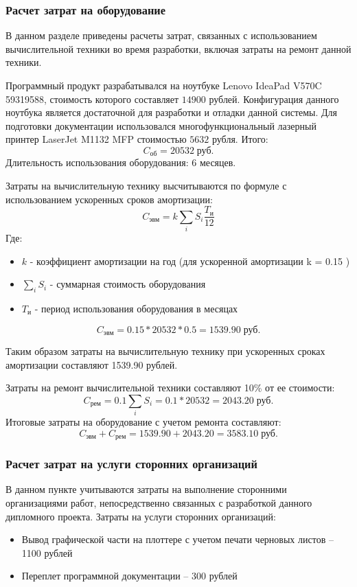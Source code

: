 \documentclass[russian,utf8,emptystyle]{eskdtext}
\begin{document}
\begin{spacing}{1.5}
\subsubsection{Расчет затрат на оборудование}
В данном разделе приведены расчеты затрат, связанных с использованием вычислительной техники во время разработки, включая затраты на ремонт данной техники.

Программный продукт разрабатывался на ноутбуке Lenovo IdeaPad V570C 59319588, стоимость которого составляет $14900$ рублей. Конфигурация данного ноутбука является достаточной для разработки и отладки данной системы. Для подготовки документации использовался многофункциональный лазерный принтер LaserJet M1132 MFP стоимостью $5632$ рубля. Итого:
$$
C_\text{об} = 20532 \; \text{руб.}
$$
Длительность использования оборудования: 6 месяцев.

Затраты на вычислительную технику высчитываются по формуле с использованием ускоренных сроков амортизации:
$$
C_\text{эвм} = k \sum_i S_i \frac{T_\text{и}}{12}
$$
Где:
\begin{itemize}
\item $k$ - коэффициент амортизации на год (для ускоренной амортизации k = 0.15 )
\item $\sum_i S_i$ - суммарная стоимость оборудования
\item $T_\text{и}$ - период использования оборудования в месяцах
\end{itemize}

$$
C_\text{эвм} = 0.15 * 20532 * 0.5 = 1539.90 \; \text{руб.}
$$

Таким образом затраты на вычислительную технику при ускоренных сроках амортизации составляют 1539.90 рублей.

Затраты на ремонт вычислительной техники составляют 10\% от ее стоимости:
$$
C_\text{рем} = 0.1 \sum_i S_i = 0.1 * 20532 = 2043.20 \; \text{руб.}
$$
Итоговые затраты на оборудование с учетом ремонта составляют:
$$
C_\text{эвм} + C_\text{рем} = 1539.90 + 2043.20 = 3583.10 \; \text{руб.}
$$

\subsubsection{Расчет затрат на услуги сторонних организаций}
В данном пункте учитываются затраты на выполнение сторонними организациями работ, непосредственно связанных с разработкой данного дипломного проекта.
Затраты на услуги сторонних организаций:
\begin{itemize}
\item Вывод графической части на плоттере с учетом печати черновых листов -- 1100 рублей
\item Переплет программной документации -- 300 рублей
\end{itemize}


\end{spacing}
\end{document}
